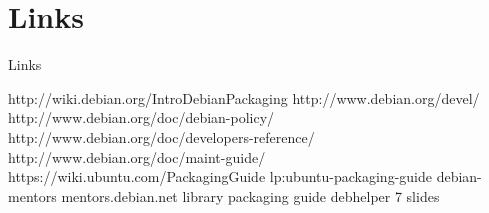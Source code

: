 \documentclass[10pt,final,handout]{beamer}
\begin{document}
\section{Links}
\begin{frame}{Links}

http://wiki.debian.org/IntroDebianPackaging
http://www.debian.org/devel/
http://www.debian.org/doc/debian-policy/
http://www.debian.org/doc/developers-reference/
http://www.debian.org/doc/maint-guide/
https://wiki.ubuntu.com/PackagingGuide
lp:ubuntu-packaging-guide
debian-mentors
mentors.debian.net
library packaging guide
debhelper 7 slides
\end{frame}
\end{document}
